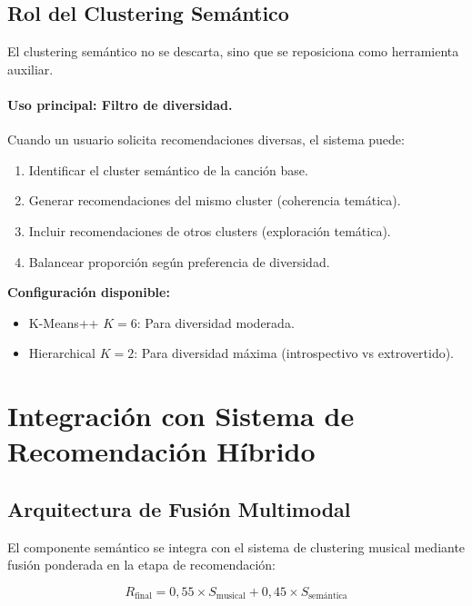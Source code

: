 \subsection{Rol del Clustering Semántico}
\label{subsec:rol-clustering}

El clustering semántico no se descarta, sino que se reposiciona como herramienta auxiliar.

\paragraph{Uso principal: Filtro de diversidad.}
Cuando un usuario solicita recomendaciones diversas, el sistema puede:
\begin{enumerate}
    \item Identificar el cluster semántico de la canción base.
    \item Generar recomendaciones del mismo cluster (coherencia temática).
    \item Incluir recomendaciones de otros clusters (exploración temática).
    \item Balancear proporción según preferencia de diversidad.
\end{enumerate}

\textbf{Configuración disponible:}
\begin{itemize}
    \item K-Means++ $K=6$: Para diversidad moderada.
    \item Hierarchical $K=2$: Para diversidad máxima (introspectivo vs extrovertido).
\end{itemize}

\section{Integración con Sistema de Recomendación Híbrido}
\label{sec:integracion-hibrido}

\subsection{Arquitectura de Fusión Multimodal}
\label{subsec:arquitectura-fusion}

El componente semántico se integra con el sistema de clustering musical mediante fusión ponderada en la etapa de recomendación:

\begin{equation}
\label{eq:fusion}
R_{\text{final}} = 0{,}55 \times S_{\text{musical}} + 0{,}45 \times S_{\text{semántica}}
\end{equation}


